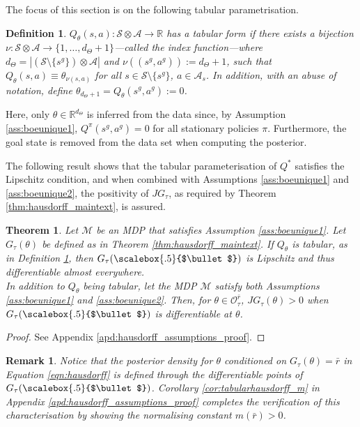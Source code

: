 \documentclass{amsart}
\newtheorem{theorem}{Theorem}[]
\newtheorem{definition}{Definition}
\newtheorem{remark}{Remark}
\renewcommand{\cdot}[1][.5]{%
  \mathbin{\vcenter{\hbox{\scalebox{#1}{$\bullet$}}}}%
}
\begin{document}
The focus of this section is on the following tabular parametrisation.


\begin{definition}
   $Q_\theta(s,a):\mathcal{S} \otimes \mathcal{A} \rightarrow \mathbb{R}$ has a tabular form if there exists a bijection  $\nu:\mathcal{S} \otimes \mathcal{A} \rightarrow \{1,\dots,d_{\Theta}+1\}$---called the index function---where $d_{\Theta}=|(\mathcal{S} \setminus \{s^g\}) \otimes \mathcal{A}|$ and  $\nu((s^g,a^g)) :=d_\Theta+1$, such that $Q_{\theta}(s,a) \equiv \theta_{\nu(s,a)}$ for all $s \in \mathcal{S}\setminus \{s^g\}$, $a \in \mathcal{A}_s$. In addition, with an abuse of notation, define $\theta_{d_\Theta+1}= Q_\theta(s^g,a^g) :=0$.
    \label{def:tabular}
\end{definition}
Here, only $\theta \in \mathbb{R}^{d_\Theta}$ is inferred from the data since, by Assumption \ref{ass:boeunique1}, $Q^\pi(s^g,a^g) =0$ for all stationary policies $\pi$.  Furthermore, the goal state is removed from the data set when computing the posterior.


The following result shows that the tabular parameterisation of $Q^*$ satisfies the Lipschitz condition, and when combined with Assumptions \ref{ass:boeunique1} and \ref{ass:boeunique2}, the positivity of $JG_\tau$, as required by Theorem \ref{thm:hausdorff_maintext}, is assured.
\begin{theorem}\label{thm:hausdorff_maintext_tabular} Let $\mathcal{M}$ be an MDP that satisfies Assumption \ref{ass:boeunique1}. Let $G_\tau(\theta)$ be defined as in Theorem \ref{thm:hausdorff_maintext}. If  $Q_\theta$ is tabular, as in Definition \ref{def:tabular}, then $G_\tau(\cdot)$ is Lipschitz and thus differentiable almost everywhere.\\
In addition to $Q_{\theta}$ being tabular, let the MDP $\mathcal{M}$ satisfy both Assumptions \ref{ass:boeunique1} and \ref{ass:boeunique2}. Then, for $\theta \in \mathcal{O}^{\bar{r}}_\tau $, $JG_\tau(\theta)>0$ when $G_\tau(\cdot)$ is differentiable at $\theta$.

\end{theorem}
\begin{proof}
    See Appendix \ref{apd:hausdorff_assumptions_proof}.
\end{proof}

\begin{remark}\label{rem:hausdorff_corr}
    Notice that the posterior density for $\theta$ conditioned on $G_\tau(\theta)=\bar{r}$ in Equation \ref{eqn:hausdorff} is defined through the differentiable points of $G_\tau(\cdot)$. Corollary \ref{cor:tabularhausdorff_m} in Appendix \ref{apd:hausdorff_assumptions_proof} completes the verification of this characterisation by showing the normalising constant $m(\bar{r}) >0$.
\end{remark}
\end{document}

